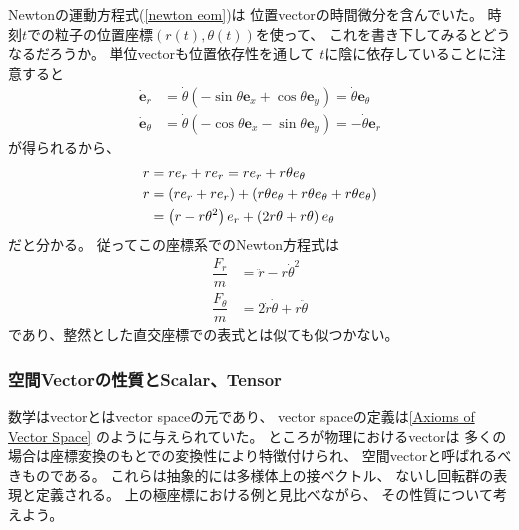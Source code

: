 Newtonの運動方程式(\ref{newton eom})は
位置vectorの時間微分を含んでいた。
時刻$t$での粒子の位置座標$(r(t), \theta(t))$を使って、
これを書き下してみるとどうなるだろうか。
単位vectorも位置依存性を通して
$t$に陰に依存していることに注意すると
\begin{subequations}
\begin{align}
  \dot{ \bm{e} }_r
  &=
  \dot{ \theta }(
    - \sin \theta \bm{e}_x
    + \cos \theta \bm{e}_y
  )
  = \dot{ \theta } \bm{e}_\theta
\\
  \dot{ \bm{e} }_\theta
  &=
  \dot{ \theta }(
    - \cos \theta \bm{e}_x
    - \sin \theta \bm{e}_y
  )
  = - \dot{ \theta } \bm{e}_r
\end{align}
\end{subequations}
が得られるから、
\begin{subequations}
\begin{align}
  r
  &=
  r e_r
  +
  r e_r
  =
  r e_r
  +
  r \theta e_\theta
\\
  r
  &=
  \left(
    r e_r
  +
    r e_r
  \right)
  +
  \left(
    r \theta e_\theta
  +
    r \theta e_\theta
  +
    r \theta e_\theta
  \right)
\notag\\&=
  \left(
    r
  -
    r \theta^2
  \right)
  e_r
  +
  \left(
    2 r \theta
  +
    r \theta
  \right)
  e_\theta
\end{align}
\end{subequations}
だと分かる。
従ってこの座標系でのNewton方程式は
\begin{align}
  \dfrac{ F_r }{m}
  &=
    \ddot{r}
  -
    r \dot{\theta}^2
\\
  \dfrac{ F_\theta }{m}
  &=
    2 \dot{r} \dot{\theta}
  +
    r \ddot{\theta}  
\end{align}
であり、整然とした直交座標での表式とは似ても似つかない。

\subsubsection{空間Vectorの性質とScalar、Tensor}

数学はvectorとはvector spaceの元であり、
vector spaceの定義は\ref{Axioms of Vector Space}
のように与えられていた。
ところが物理におけるvectorは
多くの場合は座標変換のもとでの変換性により特徴付けられ、
空間vectorと呼ばれるべきものである。
これらは抽象的には多様体上の接ベクトル、
ないし回転群の表現と定義される。
上の極座標における例と見比べながら、
その性質について考えよう。

